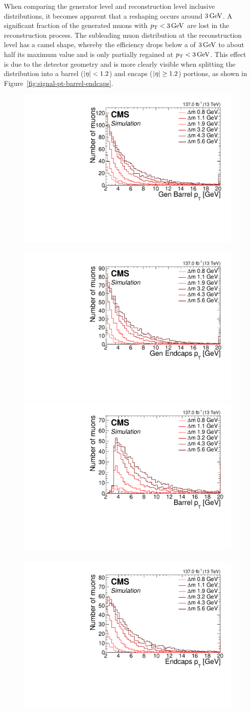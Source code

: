 When comparing the generator level and reconstruction level inclusive \pt distributions, it becomes apparent that a reshaping occurs around $3 \,\text{Ge\hspace{-.08em}V}$. A significant fraction of the generated muons with $p_{\mathrm{T}}<3\,\text{Ge\hspace{-.08em}V}$ are lost in the reconstruction process. The subleading muon \pt distribution at the reconstruction level has a camel shape, whereby the efficiency drops below a \pt of $3\,\text{Ge\hspace{-.08em}V}$ to about half its maximum value and is only partially regained at $p_{\mathrm{T}}<3\,\text{Ge\hspace{-.08em}V}$. This effect is due to the detector geometry and is more clearly visible when splitting the \pt distribution into a barrel ($\abs{\eta} < 1.2$) and encaps ($\abs{\eta} \geq 1.2$) portions, as shown in Figure~\ref{fig:signal-pt-barrel-endcaps}.

\begin{figure}[!htb]
\centering
\includegraphics[width=0.48\linewidth]{plots/signal_muons_gen/none_Muons_pt_barrel.pdf} \,
\includegraphics[width=0.48\linewidth]{plots/signal_muons_gen/none_Muons_pt_endcape.pdf}  \\
\includegraphics[width=0.48\linewidth]{plots/signal_muons/none_Muons_pt_barrel.pdf} \,
\includegraphics[width=0.48\linewidth]{plots/signal_muons/none_Muons_pt_endcape.pdf}  \\

\end{figure}
